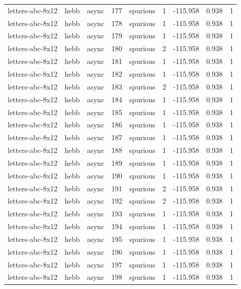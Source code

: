 \begin{tabular}{lllrlrrrr}
letters-abc-8x12 & hebb & async & 177 & spurious & 1 & -115.958 & 0.938 & 1 \\
letters-abc-8x12 & hebb & async & 178 & spurious & 1 & -115.958 & 0.938 & 1 \\
letters-abc-8x12 & hebb & async & 179 & spurious & 1 & -115.958 & 0.938 & 1 \\
letters-abc-8x12 & hebb & async & 180 & spurious & 2 & -115.958 & 0.938 & 1 \\
letters-abc-8x12 & hebb & async & 181 & spurious & 1 & -115.958 & 0.938 & 1 \\
letters-abc-8x12 & hebb & async & 182 & spurious & 1 & -115.958 & 0.938 & 1 \\
letters-abc-8x12 & hebb & async & 183 & spurious & 2 & -115.958 & 0.938 & 1 \\
letters-abc-8x12 & hebb & async & 184 & spurious & 1 & -115.958 & 0.938 & 1 \\
letters-abc-8x12 & hebb & async & 185 & spurious & 1 & -115.958 & 0.938 & 1 \\
letters-abc-8x12 & hebb & async & 186 & spurious & 1 & -115.958 & 0.938 & 1 \\
letters-abc-8x12 & hebb & async & 187 & spurious & 1 & -115.958 & 0.938 & 1 \\
letters-abc-8x12 & hebb & async & 188 & spurious & 1 & -115.958 & 0.938 & 1 \\
letters-abc-8x12 & hebb & async & 189 & spurious & 1 & -115.958 & 0.938 & 1 \\
letters-abc-8x12 & hebb & async & 190 & spurious & 1 & -115.958 & 0.938 & 1 \\
letters-abc-8x12 & hebb & async & 191 & spurious & 2 & -115.958 & 0.938 & 1 \\
letters-abc-8x12 & hebb & async & 192 & spurious & 2 & -115.958 & 0.938 & 1 \\
letters-abc-8x12 & hebb & async & 193 & spurious & 1 & -115.958 & 0.938 & 1 \\
letters-abc-8x12 & hebb & async & 194 & spurious & 1 & -115.958 & 0.938 & 1 \\
letters-abc-8x12 & hebb & async & 195 & spurious & 1 & -115.958 & 0.938 & 1 \\
letters-abc-8x12 & hebb & async & 196 & spurious & 1 & -115.958 & 0.938 & 1 \\
letters-abc-8x12 & hebb & async & 197 & spurious & 1 & -115.958 & 0.938 & 1 \\
letters-abc-8x12 & hebb & async & 198 & spurious & 1 & -115.958 & 0.938 & 1 \\

\end{tabular}
